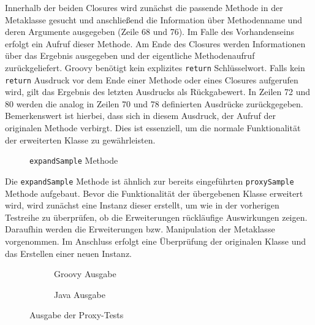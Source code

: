 Innerhalb der beiden Closures wird zunächst die passende Methode in der Metaklasse gesucht und anschließend die Information über Methodenname und deren Argumente ausgegeben (Zeile 68 und 76). 
Im Falle des Vorhandenseins erfolgt ein Aufruf dieser Methode.
Am Ende des Closures werden Informationen über das Ergebnis ausgegeben und der eigentliche Methodenaufruf zurückgeliefert. 
Groovy benötigt kein explizites \texttt{return} Schlüsselwort.
Falls kein \texttt{return} Ausdruck vor dem Ende einer Methode oder eines Closures aufgerufen wird, gilt das Ergebnis des letzten Ausdrucks als Rückgabewert. 
In Zeilen 72 und 80 werden die analog in Zeilen 70 und 78 definierten Ausdrücke zurückgegeben. 
Bemerkenswert ist hierbei, dass sich in diesem Ausdruck, der Aufruf der originalen Methode verbirgt.
Dies ist essenziell, um die normale Funktionalität der erweiterten Klasse zu gewährleisten.


\begin{figure}[hbt!]
	
	\caption{\texttt{expandSample} Methode}
	\label{fig:Metatester-expandSample}
\end{figure}


Die \texttt{expandSample} Methode ist ähnlich zur bereits eingeführten \texttt{proxySample} Methode aufgebaut. 
Bevor die Funktionalität der übergebenen Klasse erweitert wird, wird zunächst eine Instanz dieser erstellt, um wie in der vorherigen Testreihe zu überprüfen, ob die Erweiterungen rückläufige Auswirkungen zeigen. 
Daraufhin werden die Erweiterungen bzw. Manipulation der Metaklasse vorgenommen. 
Im Anschluss erfolgt eine Überprüfung der originalen Klasse und das Erstellen einer neuen Instanz.


\begin{figure}[hbt!]
	\begin{subfigure}{\textwidth}
		
		\caption{Groovy Ausgabe}
	\end{subfigure}
	
	\begin{subfigure}{\textwidth}
		
		\caption{Java Ausgabe}
	\end{subfigure}
	
	\caption{Ausgabe der Proxy-Tests}
	\label{fig:proxy-out}
\end{figure}


